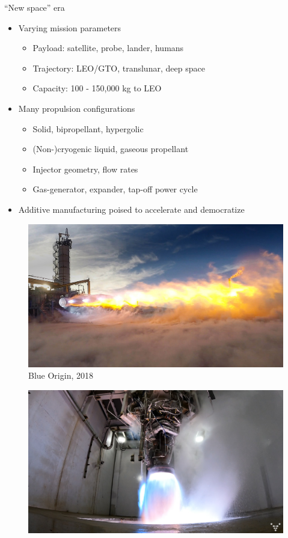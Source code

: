 \documentclass[]{beamer}
\begin{document}
\begin{frame}{``New space'' era}
    \begin{itemize}
        \item Varying mission parameters
        \begin{itemize}
            \item Payload: satellite, probe, lander, humans
            \item Trajectory: LEO/GTO, translunar, deep space
            \item Capacity: 100 - 150,000 kg to LEO
        \end{itemize}  
        \item Many propulsion configurations
        \begin{itemize}
            \item Solid, bipropellant, hypergolic
            \item (Non-)cryogenic liquid, gaseous propellant 
            \item Injector geometry, flow rates
            \item Gas-generator, expander, tap-off power cycle
        \end{itemize}
        \item Additive manufacturing poised to accelerate and democratize
    \end{itemize}
	\begin{minipage}{0.33\linewidth}
		\begin{figure}
			\includegraphics[width=0.99\linewidth]{intro/be4.jpg}
			\caption*{\tiny{Blue Origin, 2018}}
		\end{figure}
	\end{minipage}
	\begin{minipage}{0.33\linewidth}
		\begin{figure}
			\includegraphics[width=0.99\linewidth]{intro/aeonR.png}

\end{figure}
\end{minipage}
\end{frame}
\end{document}
